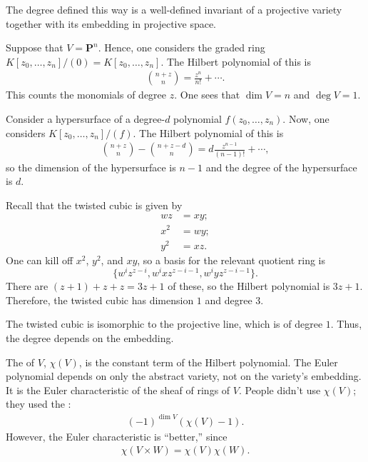 \documentclass [11 pt, oneside] {article}
\begin{document}
\begin{remark}
	The degree defined this way is a well-defined invariant of a projective variety together with its embedding in projective space.
\end{remark}

\begin{example}[ ]\label{}\text{}
Suppose that $V=\mathbf{P}^n$. Hence, one considers the graded ring $K[z_0,\hdots,z_n]/(0)=K[z_0,\hdots,z_n]$. The Hilbert polynomial of this is
\begin{align*}
	\binom{n+z}{n} = \frac{z^n}{n!} + \cdots.
\end{align*}
This counts the monomials of degree $z$. One sees that $\dim V = n$ and $\deg V = 1$. 
\end{example}

\begin{example}[ ]\label{}\text{}
Consider a hypersurface of a degree-$d$ polynomial $f(z_0,\hdots, z_n)$. Now, one considers $K[z_0,\hdots, z_n]/(f)$. The Hilbert polynomial of this is
\begin{align*}
	\binom{n+z}{n} - \binom{n+z-d}{n}  = d \frac{z^{n-1}}{(n-1)!} + \cdots,
\end{align*}
so the dimension of the hypersurface is $n-1$ and the degree of the hypersurface is $d$.
\end{example}

\begin{example}\label{}\text{}
 Recall that the twisted cubic is given by
\begin{align*}
	wz &= xy;\\
	x^2 &= wy;\\
	y^2 &= xz.
\end{align*}
One can kill off $x^2$, $y^2$, and $xy$, so a basis for the relevant quotient ring is 
\[
	\{w^iz^{z- i}, w^ixz^{z- i -1}, w^iyz^{z-i-1}\}. %
\] 
There are $( z+ 1)+z +  z = 3z + 1$ of these, so the Hilbert polynomial is $3z+1$. Therefore, the twisted cubic has dimension $1$ and degree $3$.
\end{example}

\begin{remark}
	The twisted cubic is isomorphic to the projective line, which is of degree $1$. Thus, the degree depends on the embedding.
\end{remark}

The  of $V$, $\chi(V)$, is the constant term of the Hilbert polynomial. The Euler polynomial depends on only the abstract variety, not on the variety's embedding. It is the Euler characteristic of the sheaf of rings of $V$. People didn't use $\chi(V)$; they used the :
\begin{align*}
	(-1)^{\dim V}  (\chi(V)-1).
\end{align*}
However, the Euler characteristic is ``better,'' since
\begin{align*}
	\chi(V\times W) = \chi (V)\chi (W).
\end{align*}
\end{document}
